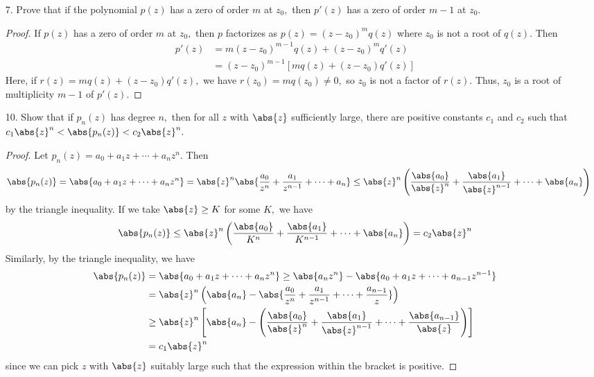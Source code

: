 \documentclass{article}
\begin{document}
\begin{itemize}
\begin{enumerate}[(a)]
		\end{enumerate}

	\item[7.] Prove that if the polynomial $p(z)$ has a zero of order $m$ at $z_0,$ then $p'(z)$ has a zero of order $m-1$ at $z_0.$
		\begin{proof}
			If $p(z)$ has a zero of order $m$ at $z_0,$ then $p$ factorizes as $p(z)=(z-z_0)^m q(z)$ where $z_0$ is not a root of $q(z).$ Then
			\begin{align*}
				p'(z) &= m(z-z_0)^{m-1} q(z) + (z-z_0)^m q'(z) \\
				&= (z-z_0)^{m-1} \left[ mq(z) + (z-z_0)q'(z) \right]
			\end{align*}
			Here, if $r(z) = mq(z) + (z-z_0)q'(z),$ we have $r(z_0) = mq(z_0) \neq 0,$ so $z_0$ is not a factor of $r(z).$ Thus, $z_0$ is a root of multiplicity $m-1$ of $p'(z).$
		\end{proof}

	\item[10.] Show that if $p_n(z)$ has degree $n,$ then for all $z$ with $\abs{z}$ sufficiently large, there are positive constants $c_1$ and $c_2$ such that $c_1\abs{z}^n<\abs{p_n(z)}<c_2\abs{z}^n.$
		\begin{proof}
			Let $p_n(z) = a_0 + a_1z + \cdots + a_nz^n.$ Then
			\begin{align*}
				\abs{p_n(z)} &= \abs{a_0 + a_1z+\cdots+a_n z^n} = \abs{z}^n \abs{\frac{a_0}{z^n} + \frac{a_1}{z^{n-1}} + \cdots + a_n} \le \abs{z}^n \left( \frac{\abs{a_0}}{\abs{z}^n} + \frac{\abs{a_1}}{\abs{z}^{n-1}} + \cdots + \abs{a_n} \right)
			\end{align*}
			by the triangle inequality. If we take $\abs{z}\ge K$ for some $K,$ we have
			\begin{align*}
				\abs{p_n(z)} \le \abs{z}^n \left( \frac{\abs{a_0}}{K^n} + \frac{\abs{a_1}}{K^{n-1}} + \cdots + \abs{a_n} \right) = c_2\abs{z}^n
			\end{align*}
			Similarly, by the triangle inequality, we have
			\begin{align*}
				\abs{p_n(z)} &=\abs{a_0 + a_1z + \cdots + a_nz^n} \ge \abs{a_nz^n} - \abs{a_0+a_1z+\cdots+a_{n-1}z^{n-1}} \\
				&= \abs{z}^n \left( \abs{a_n} - \abs{\frac{a_0}{z^n} + \frac{a_1}{z^{n-1}} + \cdots + \frac{a_{n-1}}{z}} \right) \\
				&\ge \abs{z}^n \left[ \abs{a_n} - \left( \frac{\abs{a_0}}{\abs{z}^n} + \frac{\abs{a_1}}{\abs{z}^{n-1}} + \cdots + \frac{\abs{a_{n-1}}}{\abs{z}} \right) \right] \\
				&= c_1\abs{z}^n
			\end{align*}
			since we can pick $z$ with $\abs{z}$ suitably large such that the expression within the bracket is positive. 
		\end{proof}


\end{itemize}
\end{document}
